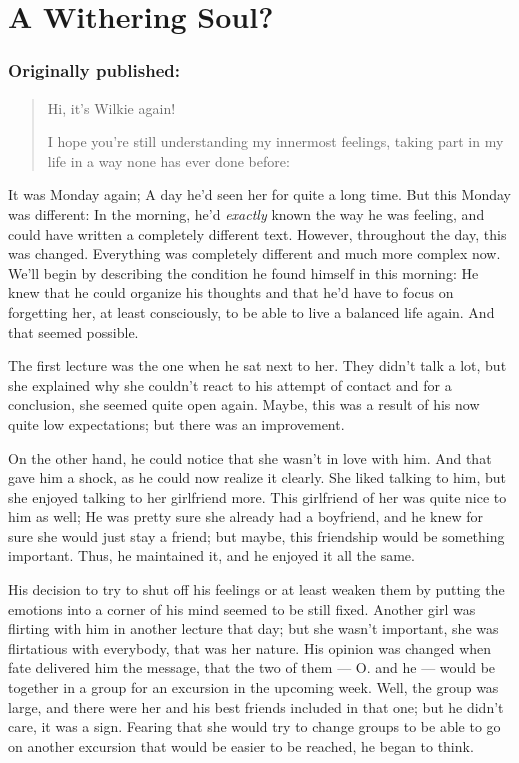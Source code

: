 \chapter{A Withering Soul?}
\label{cha:withering-soul}
\subsection*{Originally published: }
\begin{quote}
Hi, it's Wilkie again!

I hope you're still understanding my innermost feelings, taking part in my life in a way none has ever done before:
\end{quote}

It was Monday again; A day he'd seen her for quite a long time. But this Monday was different: In the morning, he'd \emph{exactly} known the way he was feeling, and could have written a completely different text. However, throughout the day, this was changed.
Everything was completely different and much more complex now. 
We'll begin by describing the condition he found himself in this morning: He knew that he could organize his thoughts and that he'd have to focus on forgetting her, at least consciously, to be able to live a balanced life again. And that seemed possible.

The first lecture was the one when he sat next to her. 
They didn't talk a lot, but she explained why she couldn't react to his attempt of contact and for a conclusion, she seemed quite open again. Maybe, this was a result of his now quite low expectations; but there was an improvement.

On the other hand, he could notice that she wasn't in love with him. 
And that gave him a shock, as he could now realize it clearly. 
She liked talking to him, but she enjoyed talking to her girlfriend more. 
This girlfriend of her was quite nice to him as well; He was pretty sure she already had a boyfriend, and he knew for sure she would just stay a friend; but maybe, this friendship would be something important. 
Thus, he maintained it, and he enjoyed it all the same.

His decision to try to shut off his feelings or at least weaken them by putting the emotions into a corner of his mind seemed to be still fixed. 
Another girl was flirting with him in another lecture that day; but she wasn't important, she was flirtatious with everybody, that was her nature. 
His opinion was changed when fate delivered him the message, that the two of them --- O. and he --- would be together in a group for an excursion in the upcoming week. Well, the group was large, and there were her and his best friends included in that one; but he didn't care, it was a sign. Fearing that she would try to change groups to be able to go on another excursion that would be easier to be reached, he began to think.

